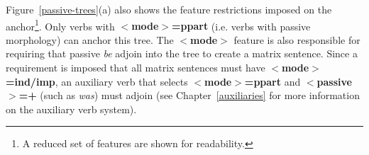 Figure~\ref{passive-trees}(a) also shows the feature restrictions imposed on
the anchor\footnote{A reduced set of features are shown for readability.}. Only
verbs with {\bf $<$mode$>$=ppart} (i.e. verbs with passive morphology) can
anchor this tree.  The {\bf $<$mode$>$} feature is also responsible for
requiring that passive {\it be} adjoin into the tree to create a matrix
sentence.  Since a requirement is imposed that all matrix sentences must have
{\bf $<$mode$>$=ind/imp}, an auxiliary verb that selects {\bf
$<$mode$>$=ppart} and {\bf $<$passive$>$=+} (such as {\it was}) must adjoin
(see Chapter~\ref{auxiliaries} for more information on the auxiliary verb
system).

 







